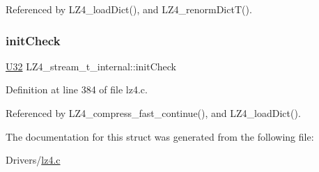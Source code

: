 Referenced by L\+Z4\+\_\+load\+Dict(), and L\+Z4\+\_\+renorm\+Dict\+T().

\mbox{\label{structLZ4__stream__t__internal_a210c641599a4633cbf4e590cbc7a0a58}} 
\subsubsection{\texorpdfstring{init\+Check}{initCheck}}
{\footnotesize\ttfamily \hyperlink{lz4_8c_ac3df7cf3c8cb172a588adec881447d68}{U32} L\+Z4\+\_\+stream\+\_\+t\+\_\+internal\+::init\+Check}



Definition at line 384 of file lz4.\+c.



Referenced by L\+Z4\+\_\+compress\+\_\+fast\+\_\+continue(), and L\+Z4\+\_\+load\+Dict().



The documentation for this struct was generated from the following file\+:\begin{DoxyCompactItemize}
\item 
Drivers/\hyperlink{lz4_8c}{lz4.\+c}\end{DoxyCompactItemize}
